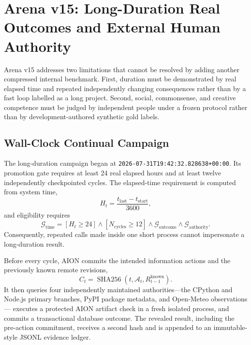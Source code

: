 \section{Arena v15: Long-Duration Real Outcomes and External Human Authority}
\label{sec:arena-v15-long-duration-human-authority}

Arena v15 addresses two limitations that cannot be resolved by adding another
compressed internal benchmark.  First, duration must be demonstrated by real
elapsed time and repeated independently changing consequences rather than by a
fast loop labelled as a long project.  Second, social, commonsense, and creative
competence must be judged by independent people under a frozen protocol rather
than by development-authored synthetic gold labels.

\subsection{Wall-Clock Continual Campaign}
\label{subsec:v15-wall-clock-campaign}

The long-duration campaign began at
\texttt{2026-07-31T19:42:32.828638+00:00}.  Its promotion gate requires at
least 24 real elapsed hours and at least twelve independently checkpointed
cycles.  The elapsed-time requirement is computed from system time,
\begin{equation}
 H_{t}=\frac{t_{\mathrm{last}}-t_{\mathrm{{start}}}}{3600},
\end{equation}
and eligibility requires
\begin{equation}
 \mathcal{G}_{\mathrm{time}}
 = [H_t\geq 24]\land[N_{\mathrm{cycles}}\geq 12]
  \land \mathcal{G}_{\mathrm{outcome}}
  \land \mathcal{G}_{\mathrm{authority}}.
\end{equation}
Consequently, repeated calls made inside one short process cannot impersonate a
long-duration result.

Before every cycle, AION commits the intended information actions and the
previously known remote revisions,
\begin{equation}
 C_t=\operatorname{SHA256}
 \left(t,\mathcal{A}_t,R^{\mathrm{known}}_{t-1}\right).
\end{equation}
It then queries four independently maintained authorities---the CPython and
Node.js primary branches, PyPI package metadata, and Open-Meteo observations---
executes a protected AION artifact check in a fresh isolated process, and
commits a transactional database outcome.  The
revealed result, including the pre-action commitment, receives a second hash
and is appended to an immutable-style JSONL evidence ledger.

